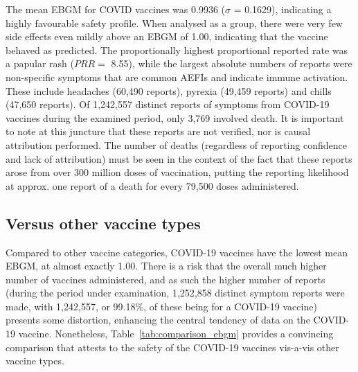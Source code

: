 \documentclass[12pt]{article}
\begin{document}
The mean EBGM for COVID vaccines was 0.9936 ($\sigma$ = 0.1629), indicating a highly favourable safety profile. When analysed as a group, there were very few side effects even mildly above an EBGM of 1.00, indicating that the vaccine behaved as predicted. The proportionally highest proportional reported rate was a papular rash ($PRR =$ 8.55), while the largest absolute numbers of reports were non-specific symptoms that are common AEFIs and indicate immune activation. These include headaches (60,490 reports), pyrexia (49,459 reports) and chills (47,650 reports). Of 1,242,557 distinct reports of symptoms from COVID-19 vaccines during the examined period, only 3,769 involved death. It is important to note at this juncture that these reports are not verified, nor is causal attribution performed. The number of deaths (regardless of reporting confidence and lack of attribution) must be seen in the context of the fact that these reports arose from over 300 million doses of vaccination, putting the reporting likelihood at approx. one report of a death for every 79,500 doses administered.


\subsection{Versus other vaccine types} %
\label{sub:versus_other_vaccine_types}

Compared to other vaccine categories, COVID-19 vaccines have the lowest mean EBGM, at almost exactly 1.00. There is a risk that the overall much higher number of vaccines administered, and as such the higher number of reports (during the period under examination, 1,252,858 distinct symptom reports were made, with 1,242,557, or 99.18\%, of these being for a COVID-19 vaccine) presents some distortion, enhancing the central tendency of data on the COVID-19 vaccine. Nonetheless, Table~\ref{tab:comparison_ebgm} provides a convincing comparison that attests to the safety of the COVID-19 vaccines vis-a-vis other vaccine types.
\end{document}
